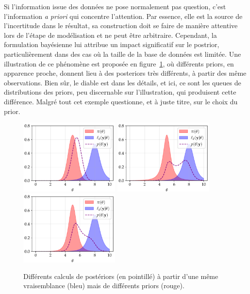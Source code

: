
Si l'information issue des données ne pose normalement pas question, c'est l'information \emph{a priori} qui concentre l'attention. Par essence, elle est la source de l'incertitude dans le résultat,  sa construction doit se faire de manière attentive lors de l'étape de modélisation et ne peut être arbitraire. 
Cependant, la formulation bayésienne lui attribue un impact significatif sur le postrior, particulièrement dans des cas où la taille de la base de données est limitée. Une illustration de ce phénomène est proposée en figure~\ref{fig:intro-differentsposteriors}, où différents priors, en apparence proche, donnent lieu à des posteriors très différents, à partir des même observations.
Bien sûr, le diable est dans les détails, et ici, ce sont les queues de distributions des priors, peu discernable sur l'illustration, qui produisent cette différence. Malgré tout cet exemple questionne, et à juste titre, sur le choix du prior.

\begin{figure}[h]
    \centering
    \includegraphics[width=5cm]{figures/intro/posterior1.pdf}
    \includegraphics[width=5cm]{figures/intro/posterior2.pdf}
    \includegraphics[width=5cm]{figures/intro/posterior3.pdf}   
    \caption{Différents calculs de postériors (en pointillé) à partir d'une même vraisemblance (bleu) mais de différents priors (rouge).%
    }
    \label{fig:intro-differentsposteriors}
\end{figure}


